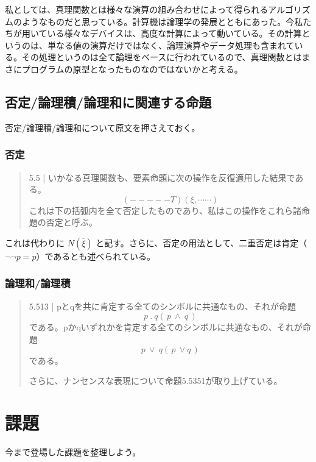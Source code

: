 \documentclass[a4paper,onecolumn,article]{jarticle}
\newcounter{ct}               %
\begin{document}
私としては、真理関数とは様々な演算の組み合わせによって得られるアルゴリズムのようなものだと思っている。計算機は論理学の発展とともにあった。今私たちが用いている様々なデバイスは、高度な計算によって動いている。その計算というのは、単なる値の演算だけではなく、論理演算やデータ処理も含まれている。その処理というのは全て論理をベースに行われているので、真理関数とはまさにプログラムの原型となったものなのではないかと考える。

\subsection{否定/論理積/論理和に関連する命題}

否定/論理積/論理和について原文を押さえておく。

\subsubsection{否定}

\begin{quote}
  5.5 | いかなる真理関数も、要素命題に次の操作を反復適用した結果である。
  \[ (-----T)(\xi, \cdots \cdots) \]
  これは下の括弧内を全て否定したものであり、私はこの操作をこれら諸命題の否定と呼ぶ。
\end{quote}

これは代わりに
$ N( \overline{ \xi } ) $
と記す。さらに、否定の用法として、二重否定は肯定（$\lnot \lnot p = p$）であるとも述べられている。
\subsubsection{論理和/論理積}
\begin{quote}
  5.513 | pとqを共に肯定する全てのシンボルに共通なもの、それが命題
  \[
     p \ . \ q  ( \, p \ \land \ q\, )
  \]
    である。pかqいずれかを肯定する全てのシンボルに共通なもの、それが命題
  \[
     p \ \vee \ q (\,p \ \lor q \,)
  \]
    である。

  さらに、ナンセンスな表現について命題5.5351が取り上げている。
\end{quote}



\section{課題}

今まで登場した課題を整理しよう。
\end{document}
